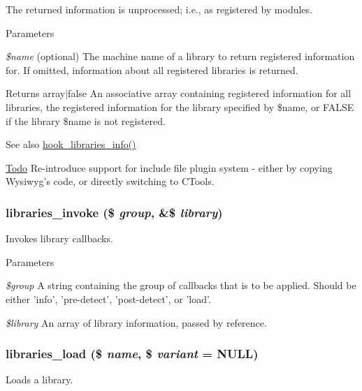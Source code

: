 The returned information is unprocessed; i.e., as registered by modules.


\begin{DoxyParams}{Parameters}
\item[{\em \$name}](optional) The machine name of a library to return registered information for. If omitted, information about all registered libraries is returned.\end{DoxyParams}
\begin{DoxyReturn}{Returns}
array$|$false An associative array containing registered information for all libraries, the registered information for the library specified by \$name, or FALSE if the library \$name is not registered.
\end{DoxyReturn}
\begin{DoxySeeAlso}{See also}
\hyperlink{libraries_8api_8php_abe57a1a01f1d2d134a9014258fe9e016}{hook\_\-libraries\_\-info()}
\end{DoxySeeAlso}
\begin{Desc}
\item[\hyperlink{todo__todo000038}{Todo}]Re-\/introduce support for include file plugin system -\/ either by copying Wysiwyg's code, or directly switching to CTools. \end{Desc}
\hypertarget{libraries_8module_a3ac265c084e45903a8b9c4677d534f5b}{
\subsubsection[{libraries\_\-invoke}]{\setlength{\rightskip}{0pt plus 5cm}libraries\_\-invoke (\$ {\em group}, \/  \&\$ {\em library})}}
\label{libraries_8module_a3ac265c084e45903a8b9c4677d534f5b}
Invokes library callbacks.


\begin{DoxyParams}{Parameters}
\item[{\em \$group}]A string containing the group of callbacks that is to be applied. Should be either 'info', 'pre-\/detect', 'post-\/detect', or 'load'. \item[{\em \$library}]An array of library information, passed by reference. \end{DoxyParams}
\hypertarget{libraries_8module_a015c6cdcfc3a14262a48dcfe344a70de}{
\subsubsection[{libraries\_\-load}]{\setlength{\rightskip}{0pt plus 5cm}libraries\_\-load (\$ {\em name}, \/  \$ {\em variant} = {\ttfamily NULL})}}
\label{libraries_8module_a015c6cdcfc3a14262a48dcfe344a70de}
Loads a library.


